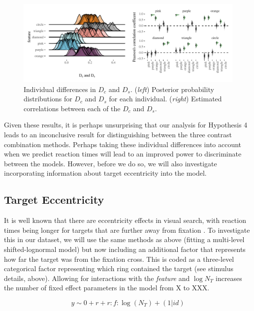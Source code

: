 \documentclass[preprint,12pt,authoryear]{elsarticle}
\begin{document}
\begin{figure}[ht]
\centering
\includegraphics[width=\textwidth]{../plots/single_feature_correlations.pdf}
\caption{Individual differences in $D_c$ and $D_s$. (\textit{left}) Posterior probability distributions for $D_c$ and $D_s$ for each individual. (\textit{right}) Estimated correlations between each of the $D_c$ and $D_s$.}
\label{fig:exp_corr}
\end{figure}

Given these results, it is perhaps unsurprising that our analysis for Hypothesis 4 leads to an inconclusive result for distinguishing between the three contrast combination methods. Perhaps taking these individual differences into account when we predict reaction times will lead to an improved power to discriminate between the models. However, before we do so, we will also investigate incorporating information about target eccentricity into the model.

\subsection{Target Eccentricity}

It is well known that there are eccentricity effects in visual search, with reaction times being longer for targets that are further away from fixation \citep{carrasco1995eccentricity}. To investigate this in our dataset, we will use the same methods as above (fitting a multi-level shifted-lognormal model) but now including an additional factor that represents how far the target was from the fixation cross. This is coded as a three-level categorical factor representing which ring contained the target (see stimulus details, above). Allowing for interactions with the \textit{feature} and $\log{N_T}$ increases the number of fixed effect parameters in the model from X to XXX. 

\begin{equation}
y \sim 0 + r + r:f:\log(N_T) + (1|id)
\end{equation}
\end{document}
